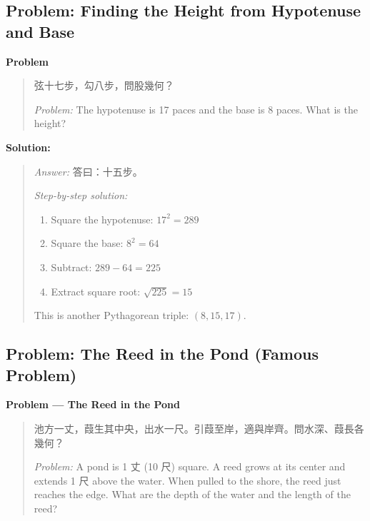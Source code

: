 \documentclass[11pt,a4paper]{article}
\newcommand{\zh}[1]{{#1}}
\newenvironment{chproblem}[1][]{%
  \par\medskip\noindent\textbf{\textcolor{sectioncolor}{#1}}\par\nopagebreak
  \begin{quote}\small
}{%
  \end{quote}\medskip
}
\newenvironment{chsolution}{%
  \par\medskip\noindent\textbf{\textcolor{notecolor}{Solution:}}\par\nopagebreak
  \begin{quote}\small
}{%
  \end{quote}\medskip
}
\newenvironment{stepbystep}{%
  \par\smallskip\noindent\textit{Step-by-step solution:}\par\nopagebreak
  \begin{enumerate}[leftmargin=2em,label=\textbf{Step \arabic*:},ref=\arabic*]
}{%
  \end{enumerate}\medskip
}
\begin{document}
\subsection{Problem: Finding the Height from Hypotenuse and Base}

\begin{chproblem}[Problem]
\zh{弦十七步，勾八步，問股幾何？}

\medskip
\textit{Problem:} The hypotenuse is 17 paces and the base is 8 paces. What is
the height?
\end{chproblem}

\begin{chsolution}
\textit{Answer:} \zh{答曰：十五步。}

\begin{stepbystep}
\item Square the hypotenuse: $17^2 = 289$
\item Square the base: $8^2 = 64$
\item Subtract: $289 - 64 = 225$
\item Extract square root: $\sqrt{225} = 15$
\end{stepbystep}

This is another Pythagorean triple: $(8, 15, 17)$.
\end{chsolution}

\subsection{Problem: The Reed in the Pond (Famous Problem)}

\begin{chproblem}[Problem --- The Reed in the Pond]
\zh{池方一丈，葭生其中央，出水一尺。引葭至岸，適與岸齊。問水深、葭長各幾何？}

\medskip
\textit{Problem:} A pond is 1 \zh{丈} (10 \zh{尺}) square. A reed grows at its
center and extends 1 \zh{尺} above the water. When pulled to the shore, the
reed just reaches the edge. What are the depth of the water and the length
of the reed?
\end{chproblem}
\end{document}
